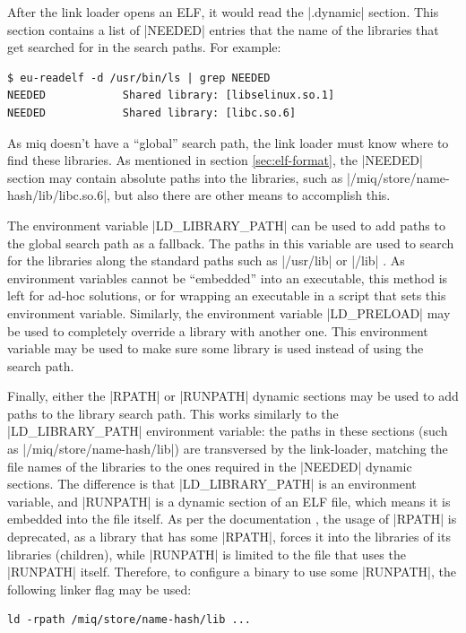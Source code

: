 After the link loader opens an \ac{ELF}, it would read the
|.dynamic| section. This section contains a list of |NEEDED|
entries that the name of the libraries that get searched for
in the search paths. For example:

\begin{verbatim}
$ eu-readelf -d /usr/bin/ls | grep NEEDED
NEEDED            Shared library: [libselinux.so.1]
NEEDED            Shared library: [libc.so.6]
\end{verbatim}

As miq doesn't have a ``global'' search path, the link
loader must know where to find these libraries. As mentioned
in section \ref{sec:elf-format}, the |NEEDED| section may
contain absolute paths into the libraries, such as
|/miq/store/name-hash/lib/libc.so.6|, but also there are
other means to accomplish this.

The environment variable |LD_LIBRARY_PATH| can be used to
add paths to the global search path as a fallback. The paths
in this variable are used
to search for the libraries along the standard paths such as
|/usr/lib| or |/lib| . As environment
variables cannot be ``embedded'' into an executable, this method
is left for ad-hoc solutions, or for wrapping an executable
in a script that sets this environment variable. Similarly,
the environment variable |LD_PRELOAD| may be used to
completely override a library with another one. This
environment variable may be used to make sure some library
is used instead of using the search path.

Finally, either the |RPATH| or |RUNPATH| dynamic sections
may be used to add paths to the library search path. This
works similarly to the |LD_LIBRARY_PATH| environment
variable: the paths in these sections (such as
|/miq/store/name-hash/lib|) are transversed by the
link-loader, matching the file names of the libraries to the
ones required in the |NEEDED| dynamic sections. The
difference is that |LD_LIBRARY_PATH| is an environment
variable, and |RUNPATH| is a dynamic section of an \ac{ELF}
file, which means it is embedded into the file itself. As
per the documentation \cite{LdLinuxManual}, the usage of
|RPATH| is deprecated, as a library that has some |RPATH|,
forces it into the libraries of its libraries (children),
while |RUNPATH| is limited to the file that uses the
|RUNPATH| itself. Therefore, to configure a binary to use
some |RUNPATH|, the following linker flag may be used:

\begin{verbatim}
ld -rpath /miq/store/name-hash/lib ...
\end{verbatim}


